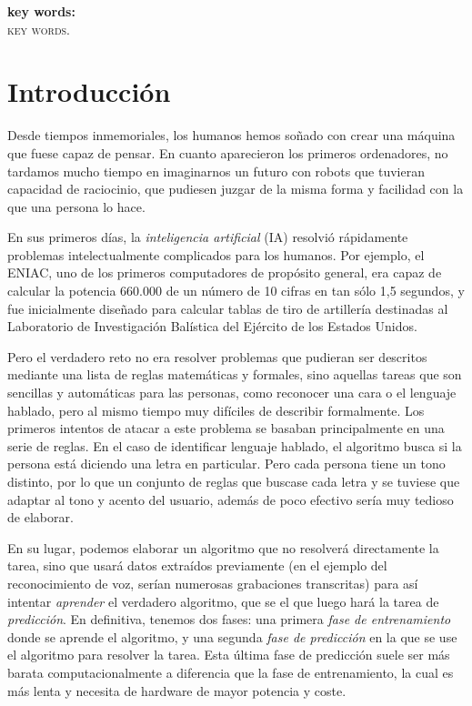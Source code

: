 \documentclass[a4paper, 12pt, oneside]{book}
\begin{document}
\vfill

\textbf{key words:}\\

\textsc{key words.}

\chapter*{Introducci\'on}
Desde tiempos inmemoriales, los humanos hemos soñado con crear una máquina
que fuese capaz de pensar. En cuanto aparecieron los primeros ordenadores, 
no tardamos mucho tiempo en imaginarnos un futuro con robots que tuvieran
capacidad de raciocinio, que pudiesen juzgar de la misma forma y facilidad
con la que una persona lo hace. 

En sus primeros días, la \textit{inteligencia artificial} (IA) resolvió 
rápidamente problemas intelectualmente complicados para los humanos. 
Por ejemplo, el ENIAC, uno de los primeros computadores de propósito general,
era capaz de calcular la potencia 660.000 de un número de 10 cifras en tan
sólo 1,5 segundos, y fue inicialmente diseñado para calcular tablas de tiro de
artillería destinadas al Laboratorio de Investigación Balística del Ejército de los Estados Unidos. 

Pero el verdadero reto no era resolver problemas que pudieran ser descritos 
mediante una lista de reglas matemáticas y formales, sino aquellas tareas 
que son sencillas y automáticas para las personas, como reconocer una cara 
o el lenguaje hablado, pero al mismo tiempo muy difíciles de describir formalmente.
Los primeros intentos de atacar a este problema se basaban principalmente en una serie de reglas.
En el caso de identificar lenguaje hablado, el algoritmo busca si la persona está
diciendo una letra en particular. Pero cada persona tiene un tono distinto, 
por lo que un conjunto
de reglas que buscase cada letra y se tuviese que 
adaptar al tono y acento del usuario, además de poco efectivo sería muy tedioso de elaborar.

En su lugar, podemos elaborar un algoritmo que no resolverá directamente la tarea, sino que 
usará datos extraídos previamente (en el ejemplo del reconocimiento de voz, serían numerosas grabaciones transcritas)
para así intentar \textit{aprender} el verdadero algoritmo, que se el que luego hará la
tarea de \textit{predicción}. En definitiva, tenemos dos fases: una primera \textit{fase de entrenamiento}
donde se aprende el algoritmo, y una segunda \textit{fase de predicción} en la que se use 
el algoritmo para resolver la tarea. Esta última fase de predicción suele ser más barata
computacionalmente a diferencia que la fase de entrenamiento, la cual es más lenta y necesita
de hardware de mayor potencia y coste.
\end{document}
